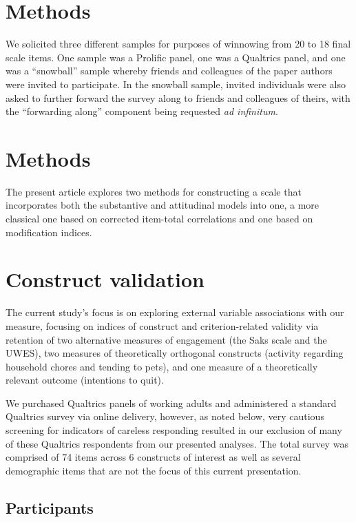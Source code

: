 \documentclass[
  man]{apa7}
\begin{document}
\hypertarget{methods}{%
\section{Methods}\label{methods}}

We solicited three different samples for purposes of winnowing from 20 to 18 final scale items. One sample was a Prolific panel, one was a Qualtrics panel, and one was a ``snowball'' sample whereby friends and colleagues of the paper authors were invited to participate. In the snowball sample, invited individuals were also asked to further forward the survey along to friends and colleagues of theirs, with the ``forwarding along'' component being requested \emph{ad infinitum}.

\hypertarget{methods-1}{%
\section{Methods}\label{methods-1}}

The present article explores two methods for constructing a scale that incorporates both the substantive and attitudinal models into one, a more classical one based on corrected item-total correlations and one based on modification indices.

\hypertarget{construct-validation}{%
\section{Construct validation}\label{construct-validation}}

The current study's focus is on exploring external variable associations with our measure, focusing on indices of construct and criterion-related validity via retention of two alternative measures of engagement (the Saks scale and the UWES), two measures of theoretically orthogonal constructs (activity regarding household chores and tending to pets), and one measure of a theoretically relevant outcome (intentions to quit).

We purchased Qualtrics panels of working adults and administered a standard Qualtrics survey via online delivery, however, as noted below, very cautious screening for indicators of careless responding resulted in our exclusion of many of these Qualtrics respondents from our presented analyses. The total survey was comprised of 74 items across 6 constructs of interest as well as several demographic items that are not the focus of this current presentation.

\hypertarget{participants}{%
\subsection{Participants}\label{participants}}
\end{document}

